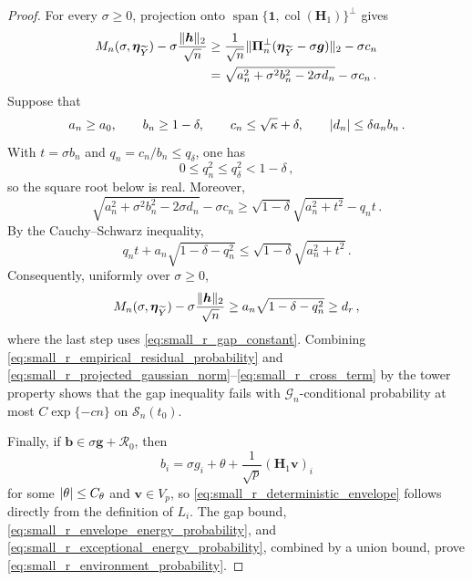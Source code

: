 \documentclass{article}
\makeatletter
\theoremstyle{definition}
\newcommand{\vnorm}[1]{%
	\ensuremath{%
		\if@display
		\left\| #1 \right\|
		\else
		\| #1 \|
		\fi
	}%
}
\newcommand{\abs}[1]{%
	\ensuremath{%
		\if@display
		\left| #1 \right|
		\else
		\lvert #1 \rvert
		\fi
	}%
}
\newcommand*{\bb}{\boldsymbol}
\def\bH {\bb{H}}
\def\bv{\bb{v}}
\def\bh{\bb{h}}
\def\bg{\bb{g}}
\def\Ytil{\widetilde{Y}}
\def\bEtaYtil{\bb{\eta}_{\Ytil}}
\def\bH{\bb{H}}
\newcommand{\vspan}{\operatorname{span}}
\makeatother
\begin{document}
\begin{bibunit}
\begin{proof}
For every $\sigma\geq0$, projection onto
$\vspan\{\bb1,\operatorname{col}(\bH_1)\}^\perp$ gives
$$
\begin{aligned}
	M_n(\sigma,\bEtaYtil)
	-
	\sigma\frac{\vnorm{\bh}_2}{\sqrt n}
	&\geq
	\frac1{\sqrt n}
	\vnorm{
		\bb\Pi_n^\perp(\bEtaYtil-\sigma\bg)
	}_2
	-
	\sigma c_n
	\\
	&=
	\sqrt{
		a_n^2+\sigma^2b_n^2-2\sigma d_n
	}
	-
	\sigma c_n\,.
\end{aligned}
$$
Suppose that
$$
	a_n\geq a_0,
	\qquad
	b_n\geq1-\delta,
	\qquad
	c_n\leq\sqrt\kappa+\delta,
	\qquad
	\abs{d_n}\leq\delta a_nb_n\,.
$$
With $t=\sigma b_n$ and $q_n=c_n/b_n\leq q_\delta$, one has
$$
	0\leq q_n^2\leq q_\delta^2<1-\delta\,,
$$
so the square root below is real. Moreover,
$$
	\sqrt{
		a_n^2+\sigma^2b_n^2-2\sigma d_n
	}
	-
	\sigma c_n
	\geq
	\sqrt{1-\delta}
	\sqrt{a_n^2+t^2}
	-
	q_nt\,.
$$
By the Cauchy--Schwarz inequality,
$$
	q_nt
	+
	a_n\sqrt{1-\delta-q_n^2}
	\leq
	\sqrt{1-\delta}
	\sqrt{a_n^2+t^2}\,.
$$
Consequently, uniformly over $\sigma\geq0$,
$$
	M_n(\sigma,\bEtaYtil)
	-
	\sigma\frac{\vnorm{\bh}_2}{\sqrt n}
	\geq
	a_n\sqrt{1-\delta-q_n^2}
	\geq
	d_r\,,
$$
where the last step uses \eqref{eq:small_r_gap_constant}.
Combining \eqref{eq:small_r_empirical_residual_probability} and
\eqref{eq:small_r_projected_gaussian_norm}--\eqref{eq:small_r_cross_term}
by the tower property shows that the gap inequality fails with
$\mathcal G_n$-conditional probability at most $C\exp\{-cn\}$ on
$\mathcal S_n(t_0)$.

Finally, if $\bb b\in\sigma\bg+\mathcal R_0$, then
$$
	b_i
	=
	\sigma g_i
	+
	\theta
	+
	\frac1{\sqrt p}(\bH_1\bv)_i
$$
for some $\abs{\theta}\leq C_\theta$ and $\bv\in V_p$, so
\eqref{eq:small_r_deterministic_envelope} follows directly from the
definition of $L_i$. The gap bound,
\eqref{eq:small_r_envelope_energy_probability}, and
\eqref{eq:small_r_exceptional_energy_probability}, combined by a union
bound, prove \eqref{eq:small_r_environment_probability}.
\end{proof}


\end{bibunit}
\end{document}
